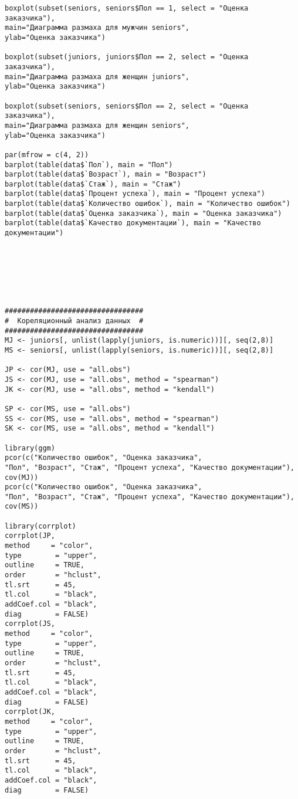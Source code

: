 \begin{verbatim}
boxplot(subset(seniors, seniors$Пол == 1, select = "Оценка заказчика"),
main="Диаграмма размаха для мужчин seniors",
ylab="Оценка заказчика")

boxplot(subset(juniors, juniors$Пол == 2, select = "Оценка заказчика"),
main="Диаграмма размаха для женщин juniors",
ylab="Оценка заказчика")

boxplot(subset(seniors, seniors$Пол == 2, select = "Оценка заказчика"),
main="Диаграмма размаха для женщин seniors",
ylab="Оценка заказчика")

par(mfrow = c(4, 2))
barplot(table(data$`Пол`), main = "Пол")
barplot(table(data$`Возраст`), main = "Возраст")
barplot(table(data$`Стаж`), main = "Стаж")
barplot(table(data$`Процент успеха`), main = "Процент успеха")
barplot(table(data$`Количество ошибок`), main = "Количество ошибок")
barplot(table(data$`Оценка заказчика`), main = "Оценка заказчика")
barplot(table(data$`Качество документации`), main = "Качество документации")







#################################
#  Кореляционный анализ данных  #
#################################
MJ <- juniors[, unlist(lapply(juniors, is.numeric))][, seq(2,8)]
MS <- seniors[, unlist(lapply(seniors, is.numeric))][, seq(2,8)]

JP <- cor(MJ, use = "all.obs")
JS <- cor(MJ, use = "all.obs", method = "spearman")
JK <- cor(MJ, use = "all.obs", method = "kendall")

SP <- cor(MS, use = "all.obs")
SS <- cor(MS, use = "all.obs", method = "spearman")
SK <- cor(MS, use = "all.obs", method = "kendall")

library(ggm)
pcor(c("Количество ошибок", "Оценка заказчика", 
"Пол", "Возраст", "Стаж", "Процент успеха", "Качество документации"),
cov(MJ))
pcor(c("Количество ошибок", "Оценка заказчика", 
"Пол", "Возраст", "Стаж", "Процент успеха", "Качество документации"), 
cov(MS))

library(corrplot)
corrplot(JP, 
method     = "color", 
type        = "upper", 
outline     = TRUE, 
order       = "hclust", 
tl.srt      = 45,
tl.col      = "black",
addCoef.col = "black", 
diag        = FALSE)
corrplot(JS, 
method     = "color", 
type        = "upper", 
outline     = TRUE, 
order       = "hclust", 
tl.srt      = 45,
tl.col      = "black",
addCoef.col = "black", 
diag        = FALSE)
corrplot(JK, 
method     = "color", 
type        = "upper", 
outline     = TRUE, 
order       = "hclust", 
tl.srt      = 45,
tl.col      = "black",
addCoef.col = "black", 
diag        = FALSE)


\end{verbatim}
